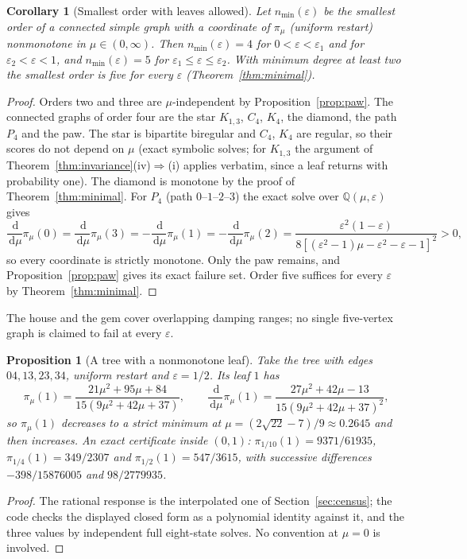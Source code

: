 \documentclass[11pt,a4paper]{article}
\newtheorem{proposition}[theorem]{Proposition}
\newtheorem{corollary}[theorem]{Corollary}
\theoremstyle{definition}\newtheorem{conjecture}{Conjecture}
\theoremstyle{remark}\newtheorem{remark}[theorem]{Remark}
\newcommand{\eps}{\varepsilon}
\newcommand{\dd}{\,\mathrm{d}}
\begin{document}
\begin{corollary}[Smallest order with leaves allowed]\label{cor:nmin}
Let $n_{\min}(\eps)$ be the smallest order of a connected simple graph with a coordinate of $\pi_\mu$ (uniform restart) nonmonotone in $\mu\in(0,\infty)$. Then $n_{\min}(\eps)=4$ for $0<\eps<\eps_1$ and for $\eps_2<\eps<1$, and $n_{\min}(\eps)=5$ for $\eps_1\leq\eps\leq\eps_2$. With minimum degree at least two the smallest order is five for every $\eps$ (Theorem~\ref{thm:minimal}).
\end{corollary}
\begin{proof}
Orders two and three are $\mu$-independent by Proposition~\ref{prop:paw}. The connected graphs of order four are the star $K_{1,3}$, $C_4$, $K_4$, the diamond, the path $P_4$ and the paw. The star is bipartite biregular and $C_4$, $K_4$ are regular, so their scores do not depend on $\mu$ (exact symbolic solves; for $K_{1,3}$ the argument of Theorem~\ref{thm:invariance}(iv)$\Rightarrow$(i) applies verbatim, since a leaf returns with probability one). The diamond is monotone by the proof of Theorem~\ref{thm:minimal}. For $P_4$ (path $0$--$1$--$2$--$3$) the exact solve over $\mathbb Q(\mu,\eps)$ gives
\[
 \frac{\dd}{\dd\mu}\pi_\mu(0)=\frac{\dd}{\dd\mu}\pi_\mu(3)=-\frac{\dd}{\dd\mu}\pi_\mu(1)=-\frac{\dd}{\dd\mu}\pi_\mu(2)=\frac{\eps^2(1-\eps)}{8[(\eps^2-1)\mu-\eps^2-\eps-1]^2}>0,
\]
so every coordinate is strictly monotone. Only the paw remains, and Proposition~\ref{prop:paw} gives its exact failure set. Order five suffices for every $\eps$ by Theorem~\ref{thm:minimal}.
\end{proof}
The house and the gem cover overlapping damping ranges; no single five-vertex graph is claimed to fail at every $\eps$.

\begin{proposition}[A tree with a nonmonotone leaf]\label{prop:tree}
Take the tree with edges $04,13,23,34$, uniform restart and $\eps=1/2$. Its leaf $1$ has
\[
 \pi_\mu(1)=\frac{21\mu^2+95\mu+84}{15(9\mu^2+42\mu+37)},\qquad
 \frac{\dd}{\dd\mu}\pi_\mu(1)=\frac{27\mu^2+42\mu-13}{15(9\mu^2+42\mu+37)^2},
\]
so $\pi_\mu(1)$ decreases to a strict minimum at $\mu=(2\sqrt{22}-7)/9\approx0.2645$ and then increases. An exact certificate inside $(0,1)$: $\pi_{1/10}(1)=9371/61935$, $\pi_{1/4}(1)=349/2307$ and $\pi_{1/2}(1)=547/3615$, with successive differences $-398/15876005$ and $98/2779935$.
\end{proposition}
\begin{proof}
The rational response is the interpolated one of Section~\ref{sec:census}; the code checks the displayed closed form as a polynomial identity against it, and the three values by independent full eight-state solves. No convention at $\mu=0$ is involved.
\end{proof}
\end{document}

